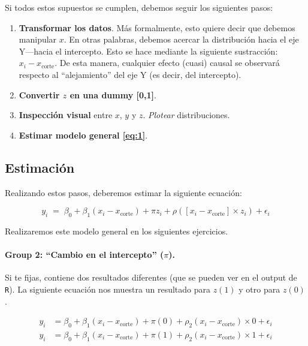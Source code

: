 \documentclass[10pt]{article}
\begin{document}
Si todos estos supuestos se cumplen, debemos seguir los siguientes pasos:

\begin{enumerate}
	\item {\bf Transformar los datos}. M\'as formalmente, esto quiere decir que debemos manipular $x$. En otras palabras, debemos acercar la distribuci\'on hacia el eje Y---hacia el intercepto. Esto se hace mediante la siguiente sustracci\'on: $x_{i}-x_{\text{corte}}$. De esta manera, cualquier efecto (cuasi) causal se observar\'a respecto al ``alejamiento'' del eje Y (es decir, del intercepto).
	\item {\bf Convertir $z$ en una dummy [0,1]}. 
	\item {\bf Inspecci\'on visual} entre $x$, $y$ y $z$. \emph{Plotear} distribuciones.
	\item {\bf Estimar modelo general \autoref{eq:1}}.
\end{enumerate}

\subsection*{Estimaci\'on}


Realizando estos pasos, deberemos estimar la siguiente ecuaci\'on:

		\begin{equation}\label{eq:3}
			y_{i} \;=\; \beta_{0} + \beta_{1}(x_{i}-x_{\text{corte}}) + \pi z_{i} + \rho([x_{i}-x_{\text{corte}}] \times z_{i}) +  \epsilon_{i}
		\end{equation}

Realizaremos este modelo general en los siguientes ejercicios.

\paragraph{Group 2: ``Cambio en el intercepto'' ($\pi$).} Si te fijas, \label{eq:3} contiene dos resultados diferentes (que se pueden ver en el output de \texttt{R}). La siguiente ecuaci\'on nos muestra un resultado para $z(1)$ y otro para $z(0)$.

\begin{equation} \label{eq:4}
\begin{split}
y_{i} & = \beta_{0} + \beta_{1}(x_{i}-x_{\text{corte}}) + \pi(0) + \rho_{2}(x_{i}-x_{\text{corte}}) \times 0 +  \epsilon_{i} \\
y_{i} & = \beta_{0} + \beta_{1}(x_{i}-x_{\text{corte}}) + \pi(1) + \rho_{2}(x_{i}-x_{\text{corte}}) \times 1 +  \epsilon_{i}
\end{split}
\end{equation}
\end{document}
